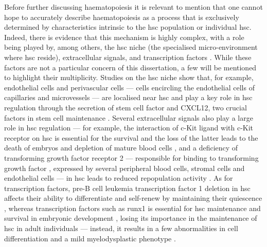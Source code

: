 Before further discussing haematopoiesis it is relevant to mention that one cannot hope to accurately describe haematopoiesis as a process that is exclusively determined by characteristics intrinsic to the \ac{hsc} population or individual \ac{hsc}. Indeed, there is evidence that this mechanism is highly complex, with a role being played by, among others, the \ac{hsc} niche (the specialised micro-environment where \ac{hsc} reside), extracellular signals, and transcription factors \cite{Wang2016-oq}. While these factors are not a particular concern of this dissertation, a few will be mentioned to highlight their multiplicity. Studies on the \ac{hsc} niche show that, for example, endothelial cells and perivascular cells --- cells encircling the endothelial cells of capillaries and microvessels \cite{Crisan2012-nl} --- are localised near \ac{hsc} \cite{Ding2012-hv,Zhou2014-fd} and play a key role in \ac{hsc} regulation through the secretion of stem cell factor and CXCL12, two crucial factors in stem cell maintenance \cite{Ding2012-hv,Sugiyama2006-vc,Greenbaum2013-rx}. Several extracellular signals also play a large role in \ac{hsc} regulation --- for example, the interaction of c-Kit ligand with c-Kit receptor on \ac{hsc} is essential for the survival and the loss of the latter leads to the death of embryos and depletion of mature blood cells \cite{Huang1990-in}, and a deficiency of transforming growth factor \Beta{} receptor 2 --- responsible for binding to transforming growth factor , expressed by several peripheral blood cells, stromal cells and endothelial cells \cite{Zhao2014-dv} --- in \ac{hsc} leads to reduced repopulation activity \cite{Yamazaki2011-yv}. As for transcription factors, pre-B cell leukemia transcription factor 1 deletion in \ac{hsc} affects their ability to differentiate and self-renew by maintaining their quiescence \cite{Ficara2008-so}, whereas transcription factors such as \ac{runx1} is essential for \ac{hsc} maintenance and survival in embryonic development \cite{Okuda1996-rd}, losing its importance in the maintenance of \ac{hsc} in adult individuals \cite{Ichikawa2004-ow} --- instead, it results in a few abnormalities in cell differentiation and a mild myelodysplastic phenotype \cite{Ichikawa2004-ow,Growney2005-zx}.

